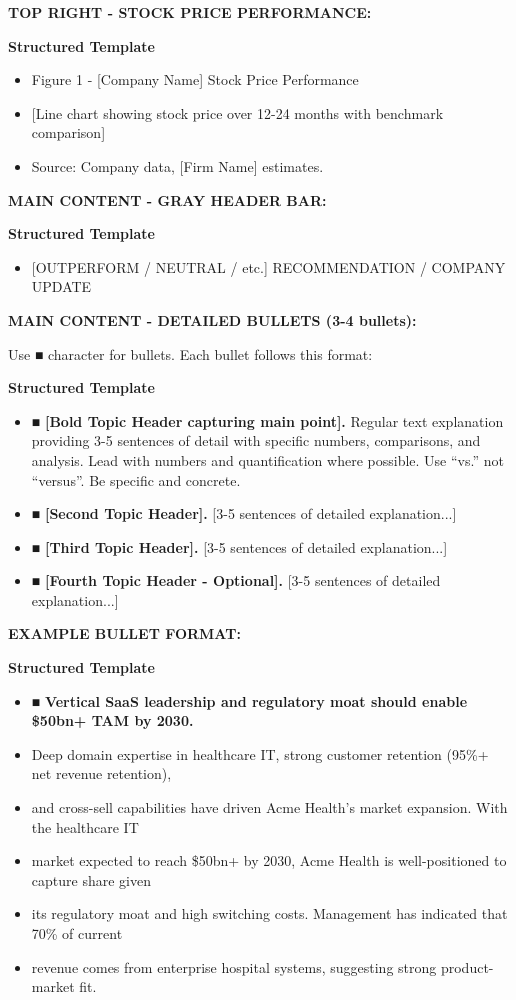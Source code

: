 \documentclass[11pt]{article}
\begin{document}
\textbf{TOP RIGHT - STOCK PRICE PERFORMANCE:}

\textbf{Structured Template}
\begin{itemize}[leftmargin=*,itemsep=2pt,topsep=2pt]
\item {} Figure 1 - [Company Name] Stock Price Performance
\item {} [Line chart showing stock price over 12-24 months with benchmark comparison]
\item {} Source: Company data, [Firm Name] estimates.
\end{itemize}

\textbf{MAIN CONTENT - GRAY HEADER BAR:}

\textbf{Structured Template}
\begin{itemize}[leftmargin=*,itemsep=2pt,topsep=2pt]
\item {} [OUTPERFORM / NEUTRAL / etc.] RECOMMENDATION / COMPANY UPDATE
\end{itemize}

\textbf{MAIN CONTENT - DETAILED BULLETS (3-4 bullets):}


Use ■ character for bullets. Each bullet follows this format:

\textbf{Structured Template}
\begin{itemize}[leftmargin=*,itemsep=2pt,topsep=2pt]
\item {} ■ \textbf{[Bold Topic Header capturing main point].} Regular text explanation providing 3-5 sentences of detail with specific numbers, comparisons, and analysis. Lead with numbers and quantification where possible. Use ``vs.'' not ``versus''. Be specific and concrete.
\item {} ■ \textbf{[Second Topic Header].} [3-5 sentences of detailed explanation...]
\item {} ■ \textbf{[Third Topic Header].} [3-5 sentences of detailed explanation...]
\item {} ■ \textbf{[Fourth Topic Header - Optional].} [3-5 sentences of detailed explanation...]
\end{itemize}

\textbf{EXAMPLE BULLET FORMAT:}

\textbf{Structured Template}
\begin{itemize}[leftmargin=*,itemsep=2pt,topsep=2pt]
\item {} ■ \textbf{Vertical SaaS leadership and regulatory moat should enable \$50bn+ TAM by 2030.}
\item {} Deep domain expertise in healthcare IT, strong customer retention (95\%+ net revenue retention),
\item {} and cross-sell capabilities have driven Acme Health's market expansion. With the healthcare IT
\item {} market expected to reach \$50bn+ by 2030, Acme Health is well-positioned to capture share given
\item {} its regulatory moat and high switching costs. Management has indicated that 70\% of current
\item {} revenue comes from enterprise hospital systems, suggesting strong product-market fit.
\end{itemize}
\end{document}
